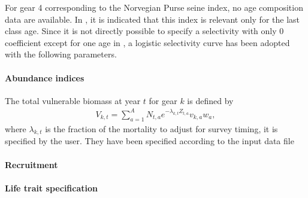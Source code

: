 For gear  4 corresponding to the  Norvegian Purse seine index,  no age
composition data  are available.  In \cite{tuna2012}, it  is indicated
that this index is  relevant only for the last class  age. Since it is
not  directly   possible  to  specify   a  selectivity  with   only  0
coefficient except for one age in \iscam, a logistic selectivity curve has been
adopted with the following parameters.


\paragraph{Abundance indices}
The total vulnerable biomass at year $t$ for gear $k$ is defined by
\begin{gather}
V_{k,t}=\sum_{a=1}^A N_{t,a} e^{-\lambda_{k,t} Z_{t,a}} v_{k,a} w_a,
\end{gather}
 where $\lambda_{k,t}$ is the fraction  of the mortality to adjust for
 survey timing, it is specified by the user. They have been
 specified according to the input data file 


\paragraph{Recruitment}


\paragraph{Life trait specification}

